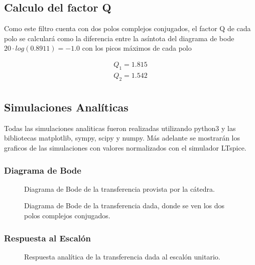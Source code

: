 \documentclass[10pt,a4paper]{article}
\begin{document}
    \subsection{Calculo del factor Q}
    Como este filtro cuenta con dos polos complejos conjugados, el factor Q de cada polo se calculará como la diferencia entre la asíntota  del diagrama de bode $20\cdot log(0.8911) = -1.0$ con los picos máximos de cada polo

    \begin{gather*}
        Q_{1} = 1.815\\
        Q_{2} = 1.542\\
    \end{gather*}



    \subsection{Simulaciones Analíticas}

    Todas las simulaciones analiticas fueron realizadas utilizando python3 y las bibliotecas matplotlib, sympy, scipy y numpy. Más adelante se mostrarán los graficos de las simulaciones con valores normalizados con el simulador LTspice.

    \subsubsection{Diagrama de Bode}\label{subsec:diagramas-de-bode}

    \begin{figure}[H]
        \centering
        \scalebox{0.9}{}
        \caption{Diagrama de Bode de la transferencia provista por la cátedra.}
        \label{fig}
    \end{figure}

    \begin{figure}[H]
        \centering
        \scalebox{0.85}{}
        \caption{Diagrama de Bode de la transferencia dada, donde se ven los dos polos complejos conjugados.}
        \label{fig}
    \end{figure}

    \subsubsection{Respuesta al Escalón}
    \begin{figure}[H]
        \centering
        \scalebox{0.85}{}
        \caption{Respuesta analítica de la transferencia dada al escalón unitario.}
        \label{fig}
    \end{figure}
\end{document}
